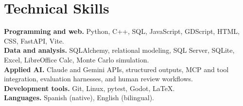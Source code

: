 \documentclass[11pt,letterpaper]{article}
\begin{document}
\section*{Technical Skills}
\textbf{Programming and web.} Python, C++, SQL, JavaScript, GDScript, HTML, CSS, FastAPI, Vite.\\[4pt]
\textbf{Data and analysis.} SQLAlchemy, relational modeling, SQL Server, SQLite, Excel, LibreOffice Calc, Monte Carlo simulation.\\[4pt]
\textbf{Applied AI.} Claude and Gemini APIs, structured outputs, MCP and tool integration, evaluation harnesses, and human review workflows.\\[4pt]
\textbf{Development tools.} Git, Linux, pytest, Godot, LaTeX.\\[4pt]
\textbf{Languages.} Spanish (native), English (bilingual).
\end{document}
